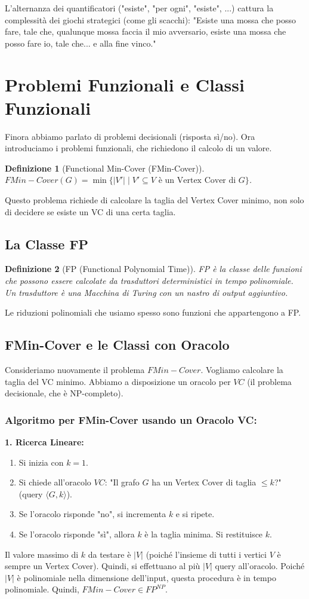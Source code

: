 \documentclass[a4paper]{article}
\newtheorem{definition}{Definizione}
\begin{document}
L'alternanza dei quantificatori ("esiste", "per ogni", "esiste", ...) cattura la complessità dei giochi strategici (come gli scacchi): "Esiste una mossa che posso fare, tale che, qualunque mossa faccia il mio avversario, esiste una mossa che posso fare io, tale che... e alla fine vinco."

\section{Problemi Funzionali e Classi Funzionali}
Finora abbiamo parlato di problemi decisionali (risposta sì/no). Ora introduciamo i problemi funzionali, che richiedono il calcolo di un valore.

\begin{definition}[Functional Min-Cover (FMin-Cover)]
$FMin-Cover(G) = \min \{ |V'| \mid V' \subseteq V \text{ è un Vertex Cover di } G \}$.
\end{definition}
Questo problema richiede di calcolare la taglia del Vertex Cover minimo, non solo di decidere se esiste un VC di una certa taglia.

\subsection{La Classe FP}
\begin{definition}[FP (Functional Polynomial Time)]
FP è la classe delle funzioni che possono essere calcolate da trasduttori deterministici in tempo polinomiale. Un trasduttore è una Macchina di Turing con un nastro di output aggiuntivo.
\end{definition}
Le riduzioni polinomiali che usiamo spesso sono funzioni che appartengono a FP.

\subsection{FMin-Cover e le Classi con Oracolo}
Consideriamo nuovamente il problema $FMin-Cover$. Vogliamo calcolare la taglia del VC minimo. Abbiamo a disposizione un oracolo per $VC$ (il problema decisionale, che è NP-completo).

\subsubsection{Algoritmo per FMin-Cover usando un Oracolo VC:}
\textbf{1. Ricerca Lineare:}
\begin{enumerate}
    \item Si inizia con $k=1$.
    \item Si chiede all'oracolo $VC$: "Il grafo $G$ ha un Vertex Cover di taglia $\le k$?" (query $\langle G, k \rangle$).
    \item Se l'oracolo risponde "no", si incrementa $k$ e si ripete.
    \item Se l'oracolo risponde "sì", allora $k$ è la taglia minima. Si restituisce $k$.
\end{enumerate}
Il valore massimo di $k$ da testare è $|V|$ (poiché l'insieme di tutti i vertici $V$ è sempre un Vertex Cover). Quindi, si effettuano al più $|V|$ query all'oracolo. Poiché $|V|$ è polinomiale nella dimensione dell'input, questa procedura è in tempo polinomiale.
Quindi, $FMin-Cover \in FP^{NP}$.
\end{document}
